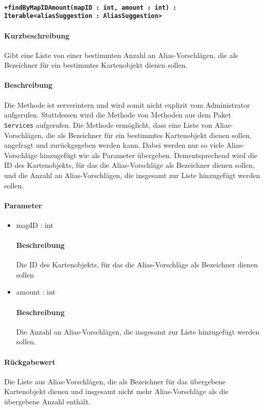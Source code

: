 \paragraph*{\texttt{+findByMapIDAmount(mapID : int, amount : int) : Iterable<aliasSuggestion : AliasSuggestion>}}%
\paragraph*{Kurzbeschreibung}
Gibt eine Liste von einer bestimmten Anzahl an Alias-Vorschlägen, die als Bezeichner für ein bestimmtes Kartenobjekt dienen sollen.
\paragraph*{Beschreibung}
Die Methode ist serverintern und wird somit nicht explizit vom Administrator aufgerufen.
Stattdessen wird die Methode von Methoden aus dem Paket \texttt{Services} aufgerufen.
Die Methode ermöglicht, dass eine Liste von Alias-Vorschlägen, die als Bezeichner für ein bestimmtes Kartenobjekt dienen sollen, angefragt und zurückgegeben werden kann.
Dabei werden nur so viele Alias-Vorschläge hinzugefügt wie als Parameter übergeben.
Dementsprechend wird die ID des Kartenobjekts, für das die Alias-Vorschläge als Bezeichner dienen sollen, und die Anzahl an Alias-Vorschlägen, die insgesamt zur Liste hinzugefügt werden sollen.
\paragraph*{Parameter}
\begin{itemize}
    \item mapID : int
    		\paragraph*{Beschreibung}
    		Die ID des Kartenobjekts, für das die Alias-Vorschläge als Bezeichner dienen sollen
    	\item amount : int
    		\paragraph*{Beschreibung}
    		Die Anzahl an Alias-Vorschlägen, die insgesamt zur Liste hinzugefügt werden sollen.
\end{itemize}
\paragraph*{Rückgabewert}
Die Liste aus Alias-Vorschlägen, die als Bezeichner für das übergebene Kartenobjekt dienen und insgesamt nicht mehr Alias-Vorschläge als die übergebene Anzahl enthält.
